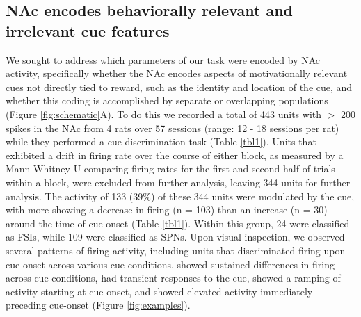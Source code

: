 \documentclass[11pt]{article}
\begin{document}
\subsection*{NAc encodes behaviorally relevant and irrelevant cue features}

We sought to address which parameters of our task were encoded by NAc
activity, specifically whether the NAc encodes aspects of
motivationally relevant cues not directly tied to reward, such as the
identity and location of the cue, and whether this coding is
accomplished by separate or overlapping populations (Figure
\ref{fig:schematic}A). To do this we recorded a total of 443 units
with $>$ 200 spikes in the NAc from 4 rats over 57 sessions (range: 12
- 18 sessions per rat) while they performed a cue discrimination task
(Table \ref{tbl1}). Units that exhibited a drift in firing rate over
the course of either block, as measured by a Mann-Whitney U comparing
firing rates for the first and second half of trials within a block,
were excluded from further analysis, leaving 344 units for further
analysis. The activity of 133 (39\%) of these 344 units were modulated
by the cue, with more showing a decrease in firing (n = 103) than an
increase (n = 30) around the time of cue-onset (Table
\ref{tbl1}). Within this group, 24 were classified as FSIs, while 109
were classified as SPNs. Upon visual inspection, we observed several
patterns of firing activity, including units that discriminated firing
upon cue-onset across various cue conditions, showed sustained
differences in firing across cue conditions, had transient responses
to the cue, showed a ramping of activity starting at cue-onset, and
showed elevated activity immediately preceding cue-onset (Figure
\ref{fig:examples}).
\end{document}
